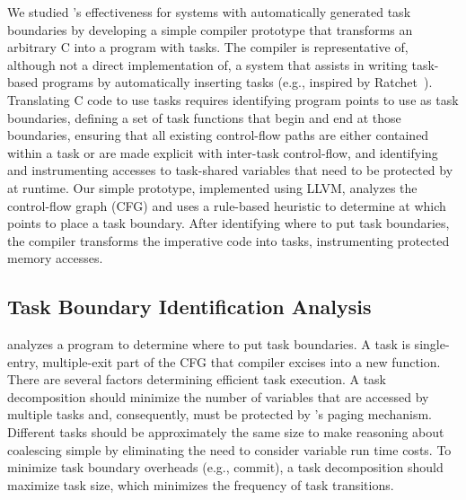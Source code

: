 We studied \sys's effectiveness for systems with automatically generated task
boundaries by developing a simple compiler prototype that transforms an
arbitrary C into a program with tasks. The compiler is representative of,
although not a direct implementation of, a system that assists in writing
task-based programs by automatically inserting tasks (e.g., inspired by
Ratchet~\cite{ratchet}). Translating C code to use tasks requires identifying program points to use as task boundaries, defining a set of task functions that begin and end at those boundaries, ensuring that all existing control-flow paths are either contained within a task or are made explicit with inter-task control-flow, and identifying and instrumenting accesses to task-shared variables that need to be protected by \sys at runtime. Our simple prototype, implemented using LLVM, analyzes the control-flow graph (CFG) and uses a rule-based heuristic to determine at which points to place a task boundary. After identifying where to put task
boundaries, the \sys compiler transforms the imperative code into tasks,
instrumenting protected memory accesses. 

\subsection{Task Boundary Identification Analysis}
\label{sec:compiler_analysis_pass}

\sys analyzes a program to determine where to put task boundaries. 
%
A task is single-entry, multiple-exit part of the CFG that \sys compiler excises
into a new function.  
%
There are several factors determining efficient task execution. A task decomposition should minimize the number of variables that are accessed by multiple tasks and, consequently, must be protected by \sys's paging mechanism. 
%
Different tasks should be approximately the same size to make reasoning about
coalescing simple by eliminating the need to consider variable run time costs. 
%
To minimize task boundary overheads (e.g., commit), a task decomposition should
maximize task size, which minimizes the frequency of task transitions.

